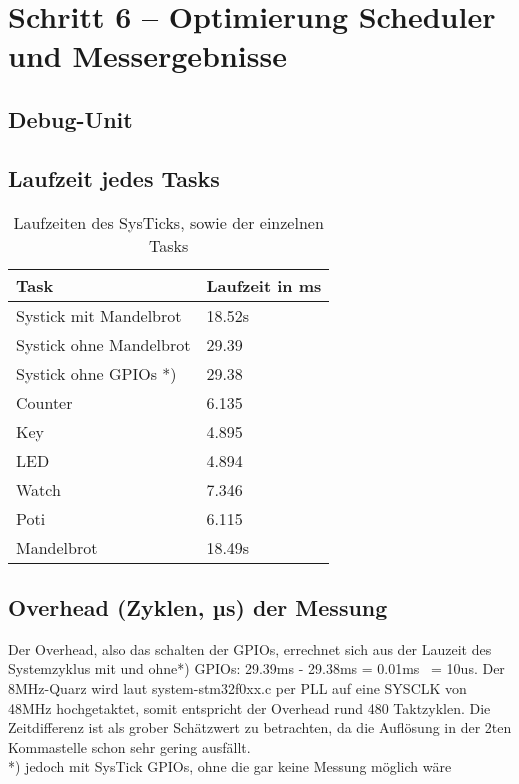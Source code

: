 \documentclass{article}
\begin{document}
\section*{Schritt 6 – Optimierung Scheduler und Messergebnisse		}

\subsection{Debug-Unit}

\subsection{Laufzeit jedes Tasks}
	\begin{table}[h!]
		\begin{center}		
			\begin{tabular}{ l | l }	 %
				Task & Laufzeit in ms \\ \hline
				Systick mit Mandelbrot	& 18.52s \\ \hline
				Systick ohne Mandelbrot	& 29.39 	\\ \hline
				Systick ohne GPIOs *)	& 29.38 \\ \hline
				Counter	& 6.135 \\ \hline
				Key& 4.895 \\ \hline
				LED	& 4.894 \\ \hline
				Watch	& 7.346 \\ \hline
				Poti	& 6.115 \\ \hline
				Mandelbrot	& 18.49s \\ %
			\end{tabular}
			\caption{Laufzeiten des SysTicks, sowie der einzelnen Tasks}
		\end{center}		
	\end{table}
\subsection{Overhead (Zyklen, µs) der Messung}
Der Overhead, also das schalten der GPIOs, errechnet sich aus der Lauzeit des Systemzyklus mit und ohne*) GPIOs: 29.39ms - 29.38ms = 0.01ms ~= 10us. Der 8MHz-Quarz wird laut system-stm32f0xx.c per PLL auf eine SYSCLK von 48MHz hochgetaktet, somit entspricht der Overhead rund 480 Taktzyklen. Die Zeitdifferenz ist als grober Schätzwert zu betrachten, da die Auflösung in der 2ten Kommastelle schon sehr gering ausfällt. \\
	*) jedoch mit SysTick GPIOs, ohne die gar keine Messung möglich wäre
\end{document}
